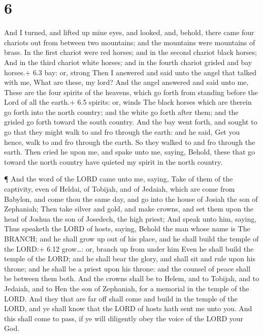 \hypertarget{section-5}{%
\section{6}\label{section-5}}

 And I turned, and lifted up mine eyes, and looked, and,
behold, there came four chariots out from between two mountains; and the
mountains were mountains of brass.  In the first chariot
were red horses; and in the second chariot black horses; 
And in the third chariot white horses; and in the fourth chariot grisled
and bay horses.+ 6.3 bay: or, strong  Then I answered and
said unto the angel that talked with me, What are these, my lord?
 And the angel answered and said unto me, These are the four
spirits of the heavens, which go forth from standing before the Lord of
all the earth.+ 6.5 spirits: or, winds  The black horses
which are therein go forth into the north country; and the white go
forth after them; and the grisled go forth toward the south country.
 And the bay went forth, and sought to go that they might
walk to and fro through the earth: and he said, Get you hence, walk to
and fro through the earth. So they walked to and fro through the earth.
 Then cried he upon me, and spake unto me, saying, Behold,
these that go toward the north country have quieted my spirit in the
north country.

 ¶ And the word of the LORD came unto me, saying,
 Take of them of the captivity, even of Heldai, of Tobijah,
and of Jedaiah, which are come from Babylon, and come thou the same day,
and go into the house of Josiah the son of Zephaniah;  Then
take silver and gold, and make crowns, and set them upon the head of
Joshua the son of Josedech, the high priest;  And speak
unto him, saying, Thus speaketh the LORD of hosts, saying, Behold the
man whose name is The BRANCH; and he shall grow up out of his place, and
he shall build the temple of the LORD:+ 6.12 grow\ldots: or, branch up
from under him  Even he shall build the temple of the LORD;
and he shall bear the glory, and shall sit and rule upon his throne; and
he shall be a priest upon his throne: and the counsel of peace shall be
between them both.  And the crowns shall be to Helem, and
to Tobijah, and to Jedaiah, and to Hen the son of Zephaniah, for a
memorial in the temple of the LORD.  And they that are far
off shall come and build in the temple of the LORD, and ye shall know
that the LORD of hosts hath sent me unto you. And this shall come to
pass, if ye will diligently obey the voice of the LORD your God.

